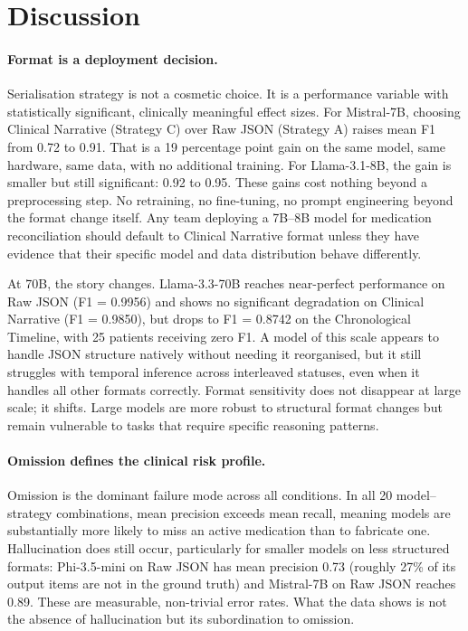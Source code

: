 \section{Discussion}
\label{sec:discussion}

\paragraph{Format is a deployment decision.}
Serialisation strategy is not a cosmetic choice. It is a performance variable with
statistically significant, clinically meaningful effect sizes. For Mistral-7B,
choosing Clinical Narrative (Strategy C) over Raw JSON (Strategy A) raises mean F1
from 0.72 to 0.91. That is a 19 percentage point gain on the same model, same hardware,
same data, with no additional training. For Llama-3.1-8B, the gain is smaller but
still significant: 0.92 to 0.95. These gains cost nothing beyond a preprocessing step.
No retraining, no fine-tuning, no prompt engineering beyond the format change itself.
Any team deploying a 7B--8B model for medication reconciliation should default to
Clinical Narrative format unless they have evidence that their specific model and data
distribution behave differently.

At 70B, the story changes. Llama-3.3-70B reaches near-perfect performance on Raw JSON
(F1 = 0.9956) and shows no significant degradation on Clinical Narrative (F1 = 0.9850),
but drops to F1 = 0.8742 on the Chronological Timeline, with 25 patients receiving zero
F1. A model of this scale appears to handle JSON structure natively without needing it
reorganised, but it still struggles with temporal inference across interleaved statuses,
even when it handles all other formats correctly. Format sensitivity does not disappear
at large scale; it shifts. Large models are more robust to structural format changes
but remain vulnerable to tasks that require specific reasoning patterns.

\paragraph{Omission defines the clinical risk profile.}
Omission is the dominant failure mode across all conditions. In all 20 model--strategy
combinations, mean precision exceeds mean recall, meaning models are substantially more
likely to miss an active medication than to fabricate one. Hallucination does still
occur, particularly for smaller models on less structured formats: Phi-3.5-mini on Raw
JSON has mean precision 0.73 (roughly 27\% of its output items are not in the ground
truth) and Mistral-7B on Raw JSON reaches 0.89. These are measurable, non-trivial error
rates. What the data shows is not the absence of hallucination but its
subordination to omission.

